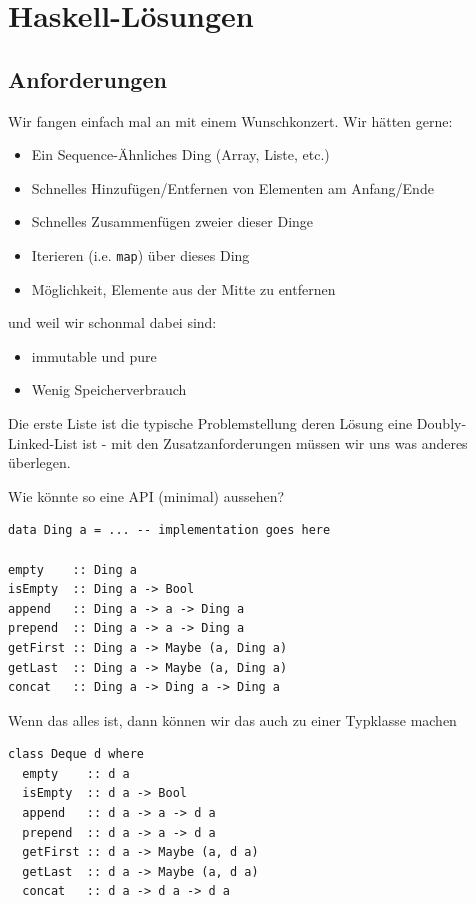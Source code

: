 \documentclass{beamer}
\begin{document}
\section{Haskell-Lösungen}
 
\subsection{Anforderungen}
\begin{frame}
Wir fangen einfach mal an mit einem Wunschkonzert. Wir hätten gerne:
\pause
\begin{itemize}
 \item Ein Sequence-Ähnliches Ding (Array, Liste, etc.)
 \pause
 \item Schnelles Hinzufügen/Entfernen von Elementen am Anfang/Ende
 \pause
 \item Schnelles Zusammenfügen zweier dieser Dinge
 \pause
 \item Iterieren (i.e. \texttt{map}) über dieses Ding
 \pause
 \item Möglichkeit, Elemente aus der Mitte zu entfernen
 \pause
\end{itemize}
\smallskip

und weil wir schonmal dabei sind:
\begin{itemize}
 \item immutable und pure
 \pause
 \item Wenig Speicherverbrauch
 \pause
\end{itemize}
Die erste Liste ist die typische Problemstellung deren Lösung eine Doubly-Linked-List ist - mit den Zusatzanforderungen müssen wir uns was anderes überlegen.
\end{frame}

\begin{frame}[fragile]
Wie könnte so eine API (minimal) aussehen?
\pause\bigskip

\begin{verbatim}
data Ding a = ... -- implementation goes here

empty    :: Ding a
isEmpty  :: Ding a -> Bool
append   :: Ding a -> a -> Ding a
prepend  :: Ding a -> a -> Ding a
getFirst :: Ding a -> Maybe (a, Ding a)
getLast  :: Ding a -> Maybe (a, Ding a)
concat   :: Ding a -> Ding a -> Ding a
\end{verbatim}
\end{frame}

\begin{frame}[fragile]
Wenn das alles ist, dann können wir das auch zu einer Typklasse machen
\pause\bigskip

\begin{verbatim}
class Deque d where
  empty    :: d a
  isEmpty  :: d a -> Bool
  append   :: d a -> a -> d a
  prepend  :: d a -> a -> d a
  getFirst :: d a -> Maybe (a, d a)
  getLast  :: d a -> Maybe (a, d a)
  concat   :: d a -> d a -> d a
\end{verbatim}
\end{frame}
\end{document}
